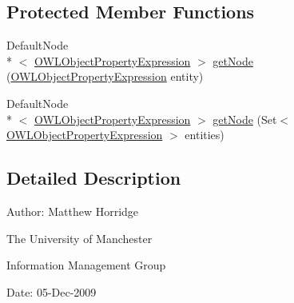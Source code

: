 \subsection*{Protected Member Functions}
\begin{DoxyCompactItemize}
\item 
Default\-Node\\*
$<$ \hyperlink{interfaceorg_1_1semanticweb_1_1owlapi_1_1model_1_1_o_w_l_object_property_expression}{O\-W\-L\-Object\-Property\-Expression} $>$ \hyperlink{classorg_1_1semanticweb_1_1owlapi_1_1reasoner_1_1impl_1_1_o_w_l_object_property_node_set_a4403dd2859edeff19ef78aa4fa5164da}{get\-Node} (\hyperlink{interfaceorg_1_1semanticweb_1_1owlapi_1_1model_1_1_o_w_l_object_property_expression}{O\-W\-L\-Object\-Property\-Expression} entity)
\item 
Default\-Node\\*
$<$ \hyperlink{interfaceorg_1_1semanticweb_1_1owlapi_1_1model_1_1_o_w_l_object_property_expression}{O\-W\-L\-Object\-Property\-Expression} $>$ \hyperlink{classorg_1_1semanticweb_1_1owlapi_1_1reasoner_1_1impl_1_1_o_w_l_object_property_node_set_ace533145647b8d94881bedf22dc4b322}{get\-Node} (Set$<$ \hyperlink{interfaceorg_1_1semanticweb_1_1owlapi_1_1model_1_1_o_w_l_object_property_expression}{O\-W\-L\-Object\-Property\-Expression} $>$ entities)
\end{DoxyCompactItemize}


\subsection{Detailed Description}
Author\-: Matthew Horridge\par
 The University of Manchester\par
 Information Management Group\par
 Date\-: 05-\/\-Dec-\/2009 

